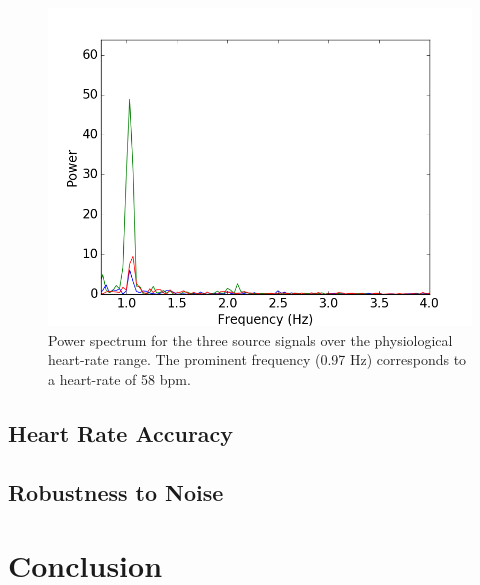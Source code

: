 \documentclass[10pt,twocolumn,letterpaper]{article}
\begin{document}
\begin{figure}
\begin{center}
	\includegraphics[scale=0.48]{figures/spectrum_10sec.png}
\end{center}
\caption{Power spectrum for the three source signals over the physiological heart-rate range. The prominent frequency (0.97 Hz) corresponds to a heart-rate of 58 bpm.}
\label{freq_plot}
\end{figure}

\subsection{Heart Rate Accuracy} \label{hr_acc}

\subsection{Robustness to Noise} \label{robust_noise}

\section{Conclusion}

\newpage

{\small


}
\end{document}
